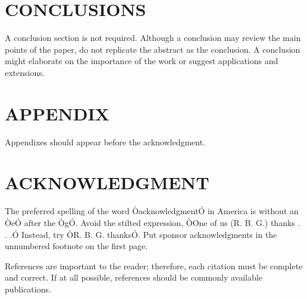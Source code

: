 \documentclass[letterpaper, 10 pt, conference]{ieeeconf}  %
\begin{document}
\section{CONCLUSIONS}

A conclusion section is not required. Although a conclusion may review the main points of the paper, do not replicate the abstract as the conclusion. A conclusion might elaborate on the importance of the work or suggest applications and extensions. 

\addtolength{\textheight}{-12cm}   %







\section*{APPENDIX}

Appendixes should appear before the acknowledgment.

\section*{ACKNOWLEDGMENT}

The preferred spelling of the word ÒacknowledgmentÓ in America is without an ÒeÓ after the ÒgÓ. Avoid the stilted expression, ÒOne of us (R. B. G.) thanks . . .Ó  Instead, try ÒR. B. G. thanksÓ. Put sponsor acknowledgments in the unnumbered footnote on the first page.




References are important to the reader; therefore, each citation must be complete and correct. If at all possible, references should be commonly available publications.





\end{document}
